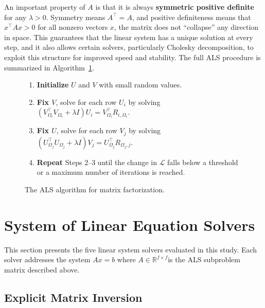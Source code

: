 \documentclass[12pt,a4paper]{report}
\begin{document}
An important property of \( A \) is that it is always \textbf{symmetric positive definite} for any \( \lambda > 0 \). Symmetry means \( A^\top = A \), and positive definiteness means that \( x^\top Ax > 0 \) for all nonzero vectors \( x \), the matrix does not ``collapse'' any direction in space. This guarantees that the linear system has a unique solution at every step, and it also allows certain solvers, particularly Cholesky decomposition, to exploit this structure for improved speed and stability. The full ALS procedure is summarized in Algorithm~\ref{alg:als}.

\begin{figure}[H]
\caption{The ALS algorithm for matrix factorization.}
\label{alg:als}
\centering
\begin{minipage}{0.85\textwidth}
\begin{enumerate}[label=\textbf{Step \arabic*.}]
    \item \textbf{Initialize} \( U \) and \( V \) with small random values.
    \item \textbf{Fix \( V \)}, solve for each row \( U_i \) by solving
          \( \left(V_{\Omega_i}^\top V_{\Omega_i} + \lambda I\right) U_i =
          V_{\Omega_i}^\top R_{i,\Omega_i} \).
    \item \textbf{Fix \( U \)}, solve for each row \( V_j \) by solving
          \( \left(U_{\Omega_j}^\top U_{\Omega_j} + \lambda I\right) V_j =
          U_{\Omega_j}^\top R_{\Omega_j,j} \).
    \item \textbf{Repeat} Steps 2--3 until the change in \( \mathcal{L} \)
          falls below a threshold or a maximum number of iterations is reached.
\end{enumerate}
\end{minipage}
\end{figure}


\section{System of Linear Equation Solvers}

This section presents the five linear system solvers evaluated in this study. Each solver addresses the system \( Ax = b \) where \( A \in \mathbb{R}^{f \times f} \)is the ALS subproblem matrix described above.

\subsection{Explicit Matrix Inversion}
\end{document}
